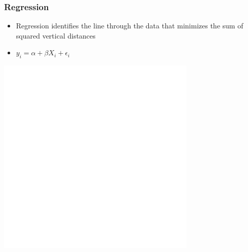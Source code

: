 \documentclass[xcolor=x11names,compress]{beamer}\usepackage[]{graphicx}\usepackage[]{color}
\makeatletter
\def\maxwidth{ %
  \ifdim\Gin@nat@width>\linewidth
    \linewidth
  \else
    \Gin@nat@width
  \fi
}
\newenvironment{knitrout}{}{} %
\renewcommand{\(}{\begin{columns}}
\renewcommand{\)}{\end{columns}}
\newcommand{\<}[1]{\begin{column}{#1}}
\renewcommand{\>}{\end{column}}
\makeatother
\begin{document}
\begin{frame}
\frametitle{Regression}
\begin{itemize}
\item Regression identifies the line through the data that minimizes the sum of squared vertical distances 
\item $y_i = \alpha + \beta X_i + \epsilon_i$
\end{itemize}
\begin{multicols}{2}
\begin{knitrout}
\color{fgcolor}
\includegraphics[width=\maxwidth]{figure/graph_reg2-1} 

\end{knitrout}
\columnbreak
\end{multicols}
\end{frame}
\end{document}
